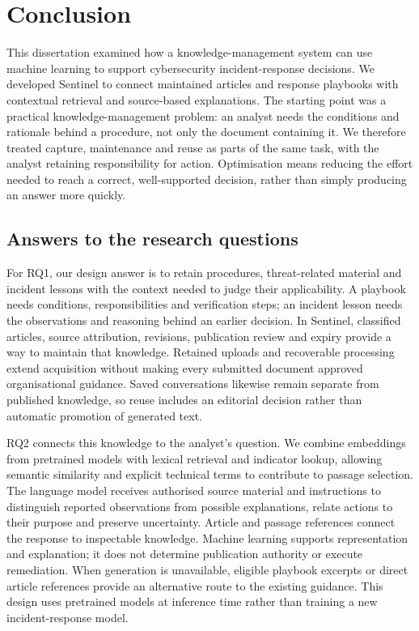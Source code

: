 \chapter{Conclusion}\label{ch:conclusion}

This dissertation examined how a knowledge-management system can use machine learning to support cybersecurity incident-response decisions. We developed Sentinel to connect maintained articles and response playbooks with contextual retrieval and source-based explanations. The starting point was a practical knowledge-management problem: an analyst needs the conditions and rationale behind a procedure, not only the document containing it. We therefore treated capture, maintenance and reuse as parts of the same task, with the analyst retaining responsibility for action. Optimisation means reducing the effort needed to reach a correct, well-supported decision, rather than simply producing an answer more quickly.

\section{Answers to the research questions}
For RQ1, our design answer is to retain procedures, threat-related material and incident lessons with the context needed to judge their applicability. A playbook needs conditions, responsibilities and verification steps; an incident lesson needs the observations and reasoning behind an earlier decision. In Sentinel, classified articles, source attribution, revisions, publication review and expiry provide a way to maintain that knowledge. Retained uploads and recoverable processing extend acquisition without making every submitted document approved organisational guidance. Saved conversations likewise remain separate from published knowledge, so reuse includes an editorial decision rather than automatic promotion of generated text.

RQ2 connects this knowledge to the analyst's question. We combine embeddings from pretrained models with lexical retrieval and indicator lookup, allowing semantic similarity and explicit technical terms to contribute to passage selection. The language model receives authorised source material and instructions to distinguish reported observations from possible explanations, relate actions to their purpose and preserve uncertainty. Article and passage references connect the response to inspectable knowledge. Machine learning supports representation and explanation; it does not determine publication authority or execute remediation. When generation is unavailable, eligible playbook excerpts or direct article references provide an alternative route to the existing guidance. This design uses pretrained models at inference time rather than training a new incident-response model.

